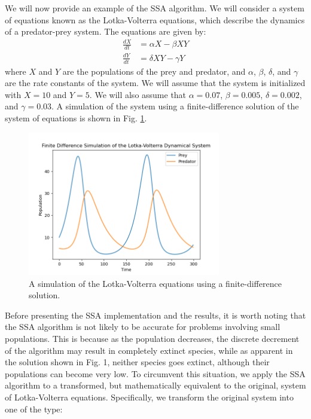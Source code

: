 \documentclass[12pt]{article}
\begin{document}
We will now provide an example of the SSA algorithm.  We will consider a system of equations known as the Lotka-Volterra equations, which describe the dynamics of a predator-prey system. The equations are given by:
\begin{align}
\frac{dX}{dt} &= \alpha X - \beta XY \\
\frac{dY}{dt} &= \delta XY - \gamma Y
\label{eq:LV}
\end{align}
where $X$ and $Y$ are the populations of the prey and predator, and $\alpha$, $\beta$, $\delta$, and $\gamma$ are the rate constants of the system.  We will assume that the system is initialized with $X=10$ and $Y=5$. We will also assume that $\alpha=0.07$, $\beta=0.005$, $\delta=0.002$, and $\gamma=0.03$. A simulation of the system using a finite-difference solution of the system of equations is shown in Fig. \ref{fig:LV}.  
\begin{figure}
\centering
\includegraphics[width=0.75\textwidth]{Lotka-Volterra.png}
\caption{A simulation of the Lotka-Volterra equations using a finite-difference solution.}
\label{fig:LV}
\end{figure}
Before presenting the SSA implementation and the results, it is worth noting that the SSA algorithm is not likely to be accurate for problems involving small populations. This is because as the population decreases, the discrete decrement of the algorithm may result in completely extinct species, while as apparent in the solution shown in Fig. 1, neither species goes extinct, although their populations can become very low. To circumvent this situation, we apply the SSA algorithm to a transformed, but mathematically equivalent to the original, system of Lotka-Volterra equations. Specifically, we transform the original system into one of the type:
\end{document}
